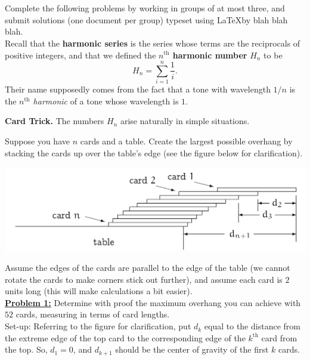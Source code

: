 \documentclass[10pt, AMS Euler]{article}
\begin{document}
	
	
	\\
     \\
	
	 Complete the following problems by working in groups of at most three, and submit solutions (one document per group) typeset using \LaTeX by blah blah blah.\\
	
	
	
	  Recall that the {\bf harmonic series} is the series whose terms are the reciprocals of positive integers, and that we defined the {\bf $n^{\mbox{th}}$ harmonic number} $H_n$ to be 
	$$H_n = \sum_{i = 1}^n \frac{1}{i}.$$
	Their name supposedly comes from the fact that a tone with wavelength $1/n$ is the \emph{$n^{\mbox{th}}$ harmonic} of a tone whose wavelength is $1$.  
	
	{\bf Card Trick.}  The numbers $H_n$ arise naturally in simple situations.  
	
	Suppose you have $n$ cards and a table.  Create the largest possible overhang by stacking the cards up over the table's edge (see the figure below for clarification).
	
	\begin{center}
		\includegraphics[scale=0.4]{Figures/Overhanging_Cards.pdf}
	\end{center}
	
	Assume the edges of the cards are parallel to the edge of the table (we cannot rotate the cards to make corners stick out further), and assume each card is $2$ units long (this will make calculations a bit easier). \\
	
	\noindent\underline{{\bf Problem 1:}} Determine with proof the maximum overhang you can achieve with $52$ cards, measuring in terms of card lengths.\\
	
	\textsf{Set-up:} Referring to the figure for clarification, put $d_k$ equal to the distance from the extreme edge of the top card to the corresponding edge of the $k^{\mbox{th}}$ card from the top.  So, $d_1 = 0$, and $d_{k+1}$ should be the center of gravity of the first $k$ cards.  
	
\end{document}
